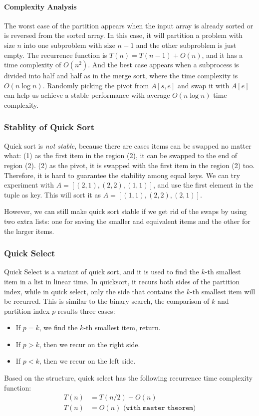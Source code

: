 \documentclass[../main.tex]{subfiles}
\begin{document}
\paragraph{Complexity Analysis} The worst case of the partition appears when the input array is already sorted or is reversed from the sorted array. In this case, it will partition a problem with size $n$ into one subproblem with size $n-1$ and the other subproblem is just empty. The recurrence function is $T(n) = T(n-1) + O(n)$, and it has a time complexity of $O(n^2)$. And the best case appears when a subprocess is divided into half and half as in the merge sort, where the time complexity is $O(n\log n)$. Randomly picking the pivot from $A[s, e]$ and swap it with $A[e]$ can help us achieve a stable performance with average $O(n\log n)$ time complexity.
\subsubsection{Stablity of Quick Sort} Quick sort is \textit{not stable}, because there are cases items can be swapped no matter what: (1) as the first item in the region (2), it can be swapped to the end of region (2). (2) as the pivot, it  is swapped with the first item in the region (2) too. Therefore, it is hard to guarantee the stability among equal keys. We can try experiment with $A = [(2, 1), (2, 2), (1, 1)]$, and use the first element in the tuple as key. This will sort it as $A=[(1, 1), (2, 2), (2, 1)]$.

However, we can still make quick sort stable if we get rid of the swaps by using two extra lists: one for saving the smaller and equivalent items and the other for the larger items. 
\subsubsection{Quick Select} 
Quick Select is a variant of quick sort, and it is used   to find the $k$-th smallest item in a list in linear time.  In quicksort,  it recurs  both sides of the partition index, while in quick select, only the side that contains the $k$-th smallest item will be recurred. This is similar to the binary search, the comparison of $k$ and partition index $p$ results three cases:
\begin{itemize}
    \item If $p=k$, we find the $k$-th smallest item, return. 
    \item If $p > k $, then we recur on the right side.
     \item If $p < k $, then we recur on the left side.
\end{itemize}
Based on the structure, quick select has the following recurrence time complexity function:
\begin{align}
T(n) &= T(n/2) + O(n)\\ 
T(n) &= O(n) \texttt{ (with master theorem)}
\end{align}
\end{document}
